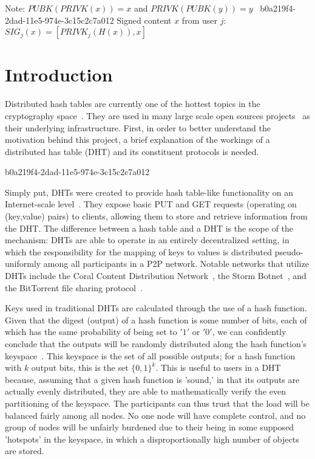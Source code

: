 \documentclass[12pt]{article}
\begin{document}
Note: $PUBK(PRIVK(x)) = x$ and $PRIVK(PUBK(y)) = y$~
b0a219f4-2dad-11e5-974e-3c15c2c7a012
Signed content $x$ from user $j$: $SIG_j(x) = \left[ PRIVK_j( H(x) ), x \right]$

\section{Introduction}
\par Distributed hash tables are currently one of the hottest topics in the cryptography space~\cite{Stoica:2001dj,Rowstron:2001ea,Ratnasamy:2001wn}. They are used in many large scale open sources projects~\cite{Freitas:2013tb,Xu:2010vs,Perfitt:2010fh} as their underlying infrastructure. First, in order to better understand the motivation behind this project, a brief explanation of the workings of a distributed has table (DHT) and its constituent protocols is needed.

b0a219f4-2dad-11e5-974e-3c15c2c7a012\par Simply put, DHTs were created to provide hash table-like functionality on an Internet-scale level~\cite{Ratnasamy:2001wn}. They expose basic PUT and GET requests (operating on (key,value) pairs) to clients, allowing them to store and retrieve information from the DHT. The difference between a hash table and a DHT is the scope of the mechanism: DHTs are able to operate in an entirely decentralized setting, in which the responsibility for the mapping of keys to values is distributed pseudo-uniformly among all participants in a P2P network. Notable networks that utilize DHTs include the Coral Content Distribution Network~\cite{Freedman:2004vb}, the Storm Botnet~\cite{Holz:2008uk}, and the BitTorrent file sharing protocol~\cite{Cohen:y1_8mBnw}.

\par Keys used in traditional DHTs are calculated through the use of a hash function. Given that the digest (output) of a hash function is some number of bits, each of which has the same probability of being set to $'1'$ or $'0'$, we can confidently conclude that the outputs will be randomly distributed along the hash function's keyspace~. This keyspace is the set of all possible outputs; for a hash function with $k$ output bits, this is the set $\{0,1\}^k$. This is useful to users in a DHT because, assuming that a given hash function is 'sound,' in that its outputs are actually evenly distributed, they are able to mathematically verify the even partitioning of the keyspace. The participants can thus trust that the load will be balanced fairly among all nodes. No one node will have complete control, and no group of nodes will be unfairly burdened due to their being in some supposed 'hotspots' in the keyspace, in which a disproportionally high number of objects are stored.~
\end{document}
